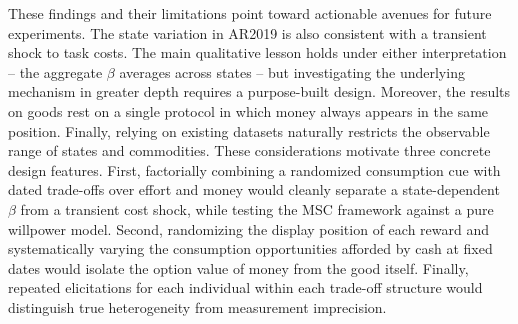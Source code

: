 \documentclass[11pt,a4paper]{article}
\theoremstyle{plain}
\theoremstyle{definition}
\begin{document}
These findings and their limitations point toward actionable avenues for future experiments.
The state variation in AR2019 is also consistent with a transient shock to task costs. The main qualitative lesson holds under either interpretation -- the aggregate $\beta$ averages across states -- but investigating the underlying mechanism in greater depth requires a purpose-built design.
Moreover, the results on goods rest on a single protocol in which money always appears in the same position. 
Finally, relying on existing datasets naturally restricts the observable range of states and commodities. 
These considerations motivate three concrete design features.
First, factorially combining a randomized consumption cue with dated trade-offs over effort and money would cleanly separate a state-dependent $\beta$ from a transient cost shock, while testing the MSC framework against a pure willpower model.
Second, randomizing the display position of each reward and systematically varying the consumption opportunities afforded by cash at fixed dates would isolate the option value of money from the good itself. Finally, repeated elicitations for each individual within each trade-off structure would distinguish true heterogeneity from measurement imprecision.

\end{document}
